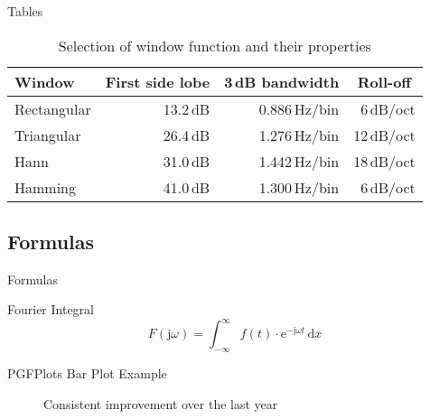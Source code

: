\documentclass[compress]{beamer}
\begin{document}
\begin{frame}{Tables}
\begin{table}[]
	\caption{Selection of window function and their properties}
	\begin{tabular}[]{lrrr}
		\toprule
		\textbf{Window}			& \multicolumn{1}{c}{\textbf{First side lobe}}	
		                    & \multicolumn{1}{c}{\textbf{3\,dB bandwidth}}
		                    & \multicolumn{1}{c}{\textbf{Roll-off}} \\
		\midrule
		Rectangular				& 13.2\,dB	& 0.886\,Hz/bin	& 6\,dB/oct		\\[0.25em]
		Triangular				& 26.4\,dB	& 1.276\,Hz/bin	& 12\,dB/oct	\\[0.25em]
		Hann					& 31.0\,dB	& 1.442\,Hz/bin	& 18\,dB/oct	\\[0.25em]
		Hamming					& 41.0\,dB	& 1.300\,Hz/bin	& 6\,dB/oct		\\
		\bottomrule
	\end{tabular}
	\label{tab:WindowFunctions}
\end{table}
\end{frame}


\subsection{Formulas}
\begin{frame}{Formulas}
\begin{block}{Fourier Integral}
\[
F(\textrm{j}\omega) = \displaystyle \int_{-\infty}^{\infty} \! f(t)\cdot\textrm{e}^{-\textrm{j}\omega t}  \, \mathrm{d} x
\]
\end{block}
\end{frame}


\begin{frame}{PGFPlots Bar Plot Example}
	\begin{figure}[h]
		\centering
		\caption{Consistent improvement over the last year}
		\end{figure}
\end{frame}
\end{document}
